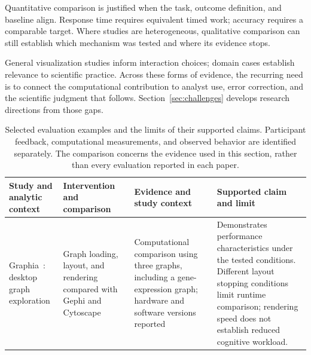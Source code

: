 Quantitative comparison is justified when the task, outcome definition, and baseline align. Response time requires equivalent timed work; accuracy requires a comparable target. Where studies are heterogeneous, qualitative comparison can still establish which mechanism was tested and where its evidence stops.

General visualization studies inform interaction choices; domain cases establish relevance to scientific practice. Across these forms of evidence, the recurring need is to connect the computational contribution to analyst use, error correction, and the scientific judgment that follows. Section~\ref{sec:challenges} develops research directions from those gaps.
\begin{table}[t]

\centering

\caption{Selected evaluation examples and the limits of their supported claims. Participant feedback, computational measurements, and observed behavior are identified separately. The comparison concerns the evidence used in this section, rather than every evaluation reported in each paper.}

\label{tab:evaluation-evidence}

\footnotesize

\setlength{\tabcolsep}{4pt}

\renewcommand{\arraystretch}{1.12}

\begin{tabular}{@{}>{\raggedright\arraybackslash}p{}>{\raggedright\arraybackslash}p{}>{\raggedright\arraybackslash}p{}>{\raggedright\arraybackslash}p{}@{}}

\toprule

\textbf{Study and analytic context} & \textbf{Intervention and comparison} & \textbf{Evidence and study context} & \textbf{Supported claim and limit} \\

\midrule

Graphia~\cite{EvalFreeman2022}: desktop graph exploration & Graph loading, layout, and rendering compared with Gephi and Cytoscape & Computational comparison using three graphs, including a gene-expression graph; hardware and software versions reported & Demonstrates performance characteristics under the tested conditions. Different layout stopping conditions limit runtime comparison; rendering speed does not establish reduced cognitive workload. \\


\end{tabular}
\end{table}
